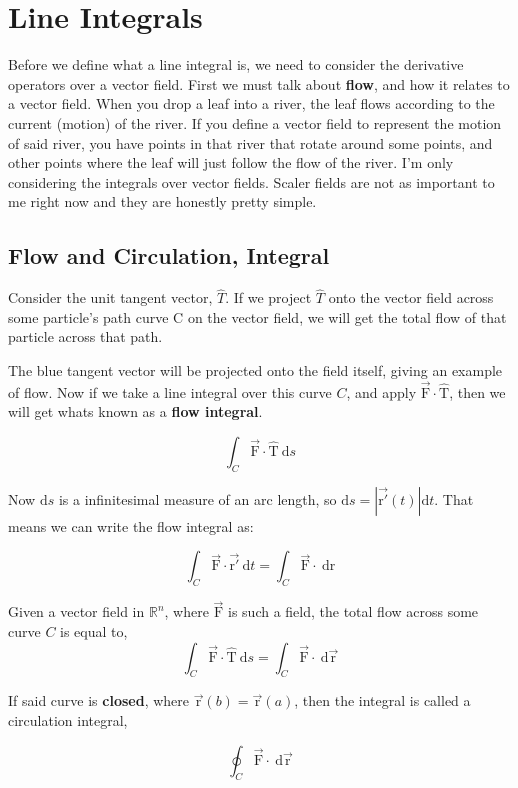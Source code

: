 \chapter{Line Integrals}
Before we define what a line integral is, we need to consider the derivative operators over 
a vector field. First we must talk about \textbf{flow}, and how it relates to a vector field. When you drop a leaf into a river, the leaf flows according to the current (motion) of the river. If you define a vector field to represent the motion of said river, you have points in that river that rotate around some points, and other points where the leaf will just follow the flow of the river. I'm only considering the integrals over vector fields. Scaler fields are not as important to me right now and they are honestly pretty simple.

\section{Flow and Circulation, Integral} 
Consider the unit tangent vector, $\hat{T}$. If we project $\hat{T}$ onto the vector field across some particle's path curve $\mathrm{C}$ on the vector field, we will get the total flow of that particle across that path.


The blue tangent vector will be projected onto the field itself, giving an example of flow. Now if we take a line integral over this curve $C$, and apply $\vec{\mathrm{F}} \cdot \hat{\mathrm{T}}$, then we will get whats known as a \textbf{flow integral}. 

\begin{equation*}
	\int_C \vec{\mathrm{F}} \cdot \mathrm{\hat{T}} \:\mathrm{d}s
\end{equation*}

Now $\mathrm{d}s$ is a infinitesimal measure of an arc length, so $\mathrm{d}s = |\vec{\mathrm{r'}}(t)|\mathrm{d}t$. That means we can write the flow integral as:

\begin{equation*}
	\int_C \vec{\mathrm{F}} \cdot \vec{\mathrm{r'}} \:\mathrm{d}t = \int_C \vec{\mathrm{F}} \cdot \:\mathrm{d}\mathrm{r}
\end{equation*}


{
	Given a vector field in $\mathbb{R}^n$, where $\vec{\mathrm{F}}$ is such a field, the total flow across some curve $C$ is equal to, 
	\begin{equation*}
		\int_C \vec{\mathrm{F}} \cdot \mathrm{\hat{T}} \:\mathrm{d}s = \int_C \vec{\mathrm{F}} \cdot \:\mathrm{d}\vec{\mathrm{r}}
	\end{equation*}

	If said curve is \textbf{closed}, where $\vec{\mathrm{r}}(b) = \vec{\mathrm{r}}(a)$,
	then the integral is called a circulation integral,

	\begin{equation*}
		\oint_C \vec{\mathrm{F}} \cdot \:\mathrm{d}\vec{\mathrm{r}}
	\end{equation*}
}


